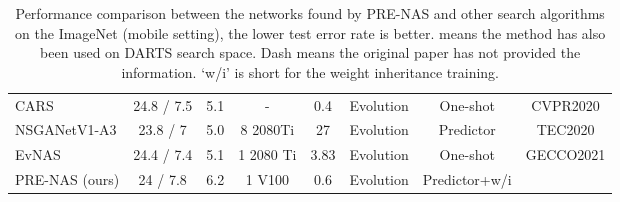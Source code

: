 \documentclass[sigconf]{acmart}
\begin{document}
\begin{table*}[!th]
\begin{tabular}{l|c|c|c|c|c|c|c}
CARS \cite{Ref:07}                  & 24.8 / 7.5                                                                                       & 5.1                                                           & -                                & 0.4                                                                       & Evolution                                  & One-shot  &CVPR2020                                     \\
NSGANetV1-A3 \cite{Ref:61}                   & 23.8 / 7                                                                                   & 5.0                                                           & 8 2080Ti                          & 27                                                                      & Evolution                                  & Predictor         &TEC2020                          \\
EvNAS \cite{Ref:62}              & 24.4 / 7.4                                                                                     & 5.1                                                           & 1 2080 Ti                                & 3.83                                                                       & Evolution                                  & One-shot       &GECCO2021 \\\hline

PRE-NAS (ours)                    & 24 / 7.8                                                                                       & 6.2                                                           & 1 V100                             & 0.6                                                                         & Evolution                                  & Predictor+w/i                                      \\ \hline
\end{tabular}
\caption{Performance comparison between the networks found by PRE-NAS and other search algorithms on the ImageNet (mobile setting), the lower test error rate is better.   means the method has also been used on DARTS search space. Dash means the original paper has not provided the information. `w/i' is short for the weight inheritance training.}
\label{imagenetresults}
\end{table*}
\end{document}
